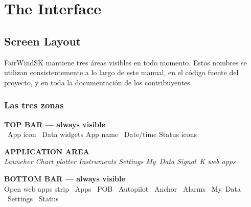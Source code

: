 \part{The Interface}

\chapter{Screen Layout}

FairWindSK mantiene tres áreas visibles en todo momento.
Estos nombres se utilizan consistentemente a lo largo de este manual, en el código fuente del proyecto,
y en toda la documentación de los contribuyentes.

\section{Las tres zonas}

\begin{center}
\begin{tcolorbox}[enhanced,colback=LtBlue,colframe=Navy,boxrule=1.5pt,arc=4pt,
  top=7pt,bottom=5pt,left=12pt,right=12pt,width=0.96\textwidth]
  {\sffamily\bfseries\color{Navy}TOP BAR --- always visible}\\[3pt]
  {\small{}~App icon \quad
         ~Data widgets \quad
         App name \quad
         ~Date/time \quad
         Status icons}
\end{tcolorbox}
\vspace{2pt}
\begin{tcolorbox}[enhanced,colback=white,colframe=Navy,boxrule=1.5pt,arc=4pt,
  top=26pt,bottom=26pt,left=12pt,right=12pt,width=0.96\textwidth]
  \centering
  {\large\sffamily\bfseries\color{MidGray}APPLICATION AREA}\\[4pt]
  {\small\sffamily\color{MidGray}\itshape
    Launcher \textbar{} Chart plotter \textbar{} Instruments \textbar{}
    Settings \textbar{} My~Data \textbar{} Signal~K web apps}
\end{tcolorbox}
\vspace{2pt}
\begin{tcolorbox}[enhanced,colback=LtBlue,colframe=Navy,boxrule=1.5pt,arc=4pt,
  top=7pt,bottom=5pt,left=12pt,right=12pt,width=0.96\textwidth]
  {\sffamily\bfseries\color{Navy}BOTTOM BAR --- always visible}\\[3pt]
  {\small
    Open web apps strip \quad
    ~Apps \quad
    ~POB \quad
    ~Autopilot \quad
    ~Anchor \quad
    ~Alarms \quad
    ~My~Data \quad
    ~Settings \quad
    ~Status}
\end{tcolorbox}
\end{center}

